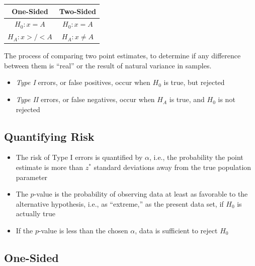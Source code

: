 
\begin{table}[htp]
  \begin{center}
    \begin{tabular}{c|c}
      One-Sided      & Two-Sided       \\
      \hline
      $H_0: x = A$   & $H_0: x = A$    \\
      $H_A: x >/< A$ & $H_A: x \neq A$
    \end{tabular}
  \end{center}
\end{table}

\vspace{-2em}

The process of comparing two point estimates, to determine if any difference between them is ``real'' or the result of natural variance in samples.

\begin{itemize}
	\item \textit{Type I} errors, or false positives, occur when $H_0$  is true, but rejected
	\item \textit{Type II} errors, or false negatives, occur when $H_A$ is true, and $H_0$ is not rejected
\end{itemize}

\subsection*{Quantifying Risk}

\begin{itemize}
	\item The risk of Type I errors is quantified by $\alpha$, i.e., the probability the point estimate is more than $z^*$ standard deviations away from the true population parameter
	\item The $p$-value is the probability of observing data at least as favorable to the alternative hypothesis, i.e., as ``extreme,'' as the present data set, if $H_0$ is actually true
	\item If the $p$-value is less than the chosen $\alpha$, data is sufficient to reject $H_0$
\end{itemize}
\hformbar




\subsection*{One-Sided}

